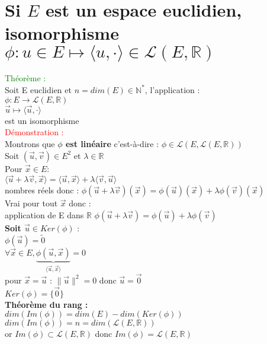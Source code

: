 \documentclass{article}
\begin{document}
\section{Si $E$ est un espace euclidien, isomorphisme \\ $\phi : u \in E \mapsto \langle u, \cdot \rangle \in \mathcal L(E, \mathbb R)$}
\textcolor{green}{Théorème :} \\
Soit E euclidien et $n=dim(E) \in \mathbb N^*$, l'application : \\
$\phi : E \rightarrow \mathcal L (E, \mathbb R)$ \\
$\vec u \mapsto \langle \vec u, \cdot \rangle $ \\
est un isomorphisme \\
\textcolor{red}{Démonstration :} \\
Montrons que {\bf \boldmath $\phi$ est linéaire} c'est-à-dire : $\phi \in \mathcal L(E,\mathcal L(E,\mathbb R))$ \\
Soit $(\vec u, \vec v) \in E^2$ et $\lambda \in \mathbb R$ \\
Pour $\vec x \in E :$ \\
$\langle \vec u + \lambda \vec v, \vec x \rangle = \langle \vec u ,\vec x \rangle + \lambda \langle \vec v, \vec u \rangle$ \\
nombres réels  donc : $\phi(\vec u+ \lambda \vec v)(\vec x)=\phi(\vec u)(\vec x) + \lambda \phi(\vec v)(\vec x)$ \\
Vrai pour tout $\vec x$ donc : \\
application de E dans $\mathbb R$ $\phi(\vec u + \lambda \vec v)=\phi(\vec u)+ \lambda \phi(\vec v)$ \\
{\bf \boldmath Soit $\vec u \in Ker(\phi)$} : \\
$\phi(\vec u)= \tilde{0}$ \\
$\forall \vec x \in E, \underbrace{\phi(\vec u, \vec x)}_{\langle \vec u,\vec x \rangle}=0$ \\
pour $\vec x = \vec u$ : $\| \vec u \|^2=0$ donc $\vec u= \vec 0$ \\
$Ker(\phi)= \lbrace \vec 0 \rbrace$ \\
{\bf Théorème du rang :} \\
$dim(Im(\phi))= dim(E)-dim(Ker(\phi))$ \\
$dim(Im(\phi))=n=dim(\mathcal L(E,\mathbb R))$ \\
or $Im(\phi) \subset \mathcal L(E,\mathbb R)$ donc $Im(\phi) = \mathcal L(E, \mathbb R)$
\end{document}
